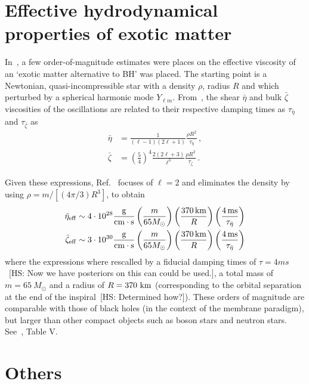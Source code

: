 \documentclass[aps,10pt,preprint,
               notitlepage,onecolumn,superscriptaddress,
               eqsecnum,
               nofootinbib,tightenlines,floatfix]{revtex4-1}
\newcommand{\hs}[1]{{\color{magenta}[HS: #1]}}
\begin{document}
\section{Effective hydrodynamical properties of exotic matter}

In~\cite{Yunes:2016jcc}, a few order-of-magnitude estimates were places on the effective
viscosity of an `exotic matter alternative to BH' was placed.
%
The starting point is a Newtonian, quasi-incompressible star with a density $\rho$,
radius $R$ and which perturbed by a spherical harmonic mode $Y_{\ell m}$.
%
From~\cite{Cutler:1987ApJ314}, the shear $\bar{\eta}$ and bulk $\bar{\zeta}$ viscosities of the oscillations are related to their
respective damping times as $\tau_{\bar{\eta}}$ and $\tau_{\bar{\zeta}}$ as
%
\begin{align}
    \bar{\eta}  &= \frac{1}{(\ell - 1) (2\ell + 1)} \frac{\rho R^2}{\tau_{\bar{\eta}}}\,,
    \\
    \bar{\zeta} &= \left(\frac{5}{4}\right)^{4} \frac{2 (2\ell +3)}{\ell^3} \frac{\rho R^2}{\tau_{\bar{\zeta}}}\,.
\end{align}
%

Given these expressions, Ref.~\cite{Yunes:2016jcc} focuses of $\ell = 2$ and eliminates the density by using
$\rho = m / [(4 \pi / 3) R^3]$, to obtain
%
\begin{align}
    \bar{\eta}_{\rm eff} &\sim 4 \cdot 10^{28} \frac{{\rm g}}{{\rm cm} \cdot {\rm s}}
    \left( \frac{m}{65 M_{\odot}} \right)
    \left( \frac{370 \, {\rm km}}{R} \right)
    \left( \frac{4 \, {\rm ms}}{\tau_{\bar{\eta}}} \right)
    \\
    \bar{\zeta}_{\rm eff} &\sim 3 \cdot 10^{30} \frac{{\rm g}}{{\rm cm} \cdot {\rm s}}
    \left( \frac{m}{65 M_{\odot}} \right)
    \left( \frac{370 \, {\rm km}}{R} \right)
    \left( \frac{4 \, {\rm ms}}{\tau_{\bar{\eta}}} \right)
\end{align}
%
where the expressions where rescalled by a fiducial damping times of $\tau = 4 ms$~\hs{Now we have posteriors on
this can could be used.}, a total mass of $m = 65~M_{\odot}$ and a radius of $R = 370~{\rm km}$ (corresponding to
the orbital separation at the end of the inspiral~\hs{Determined how?}).
%
These orders of magnitude are comparable with those of black holes (in the context of the membrane paradigm), but
larger than other compact objects such as boson stars and neutron stars. See~\cite{Yunes:2016jcc}, Table V.

\section{Others}
\end{document}

